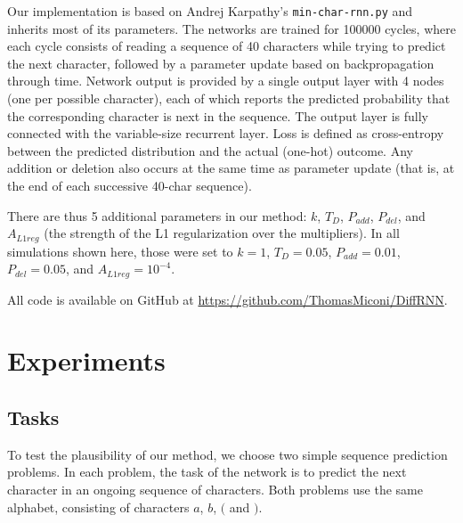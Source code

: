 \documentclass{article}
\begin{document}
Our implementation is based on Andrej Karpathy's \verb+min-char-rnn.py+ and
inherits most of its parameters.  The networks are trained for 100000 cycles,
where each cycle consists of reading a sequence of 40 characters while trying
to predict the next character, followed by a parameter update based on
backpropagation through time. Network output is provided by a single output
layer with 4 nodes (one per possible character), each of which reports the
predicted probability that the corresponding character is next in the sequence. The output layer is fully connected with the variable-size recurrent layer.
Loss is defined as cross-entropy between the predicted distribution and the
actual (one-hot) outcome.  Any addition or deletion also occurs at the same time as parameter
update (that is, at the end of each successive 40-char sequence). 



There are thus 5 additional parameters in our method: $k$, $T_D$,  $P_{add}$,
$P_{del}$, and $A_{L1reg}$ (the strength of the L1 regularization
over the multipliers). In all simulations shown here, those were set to $k=1$,
$T_D=0.05$,  $P_{add}=0.01$, $P_{del}=0.05$, and
$A_{L1reg}=10^{-4}$. 


All code is available on GitHub at \url{https://github.com/ThomasMiconi/DiffRNN}.


\section{Experiments}

\subsection{Tasks}

To test the plausibility of our method, we choose two simple sequence prediction
problems. In each problem, the task of the network is to predict the next
character in an ongoing sequence of characters. Both problems use the same
alphabet, consisting of characters $a$, $b$, $($ and $)$. 
\end{document}
